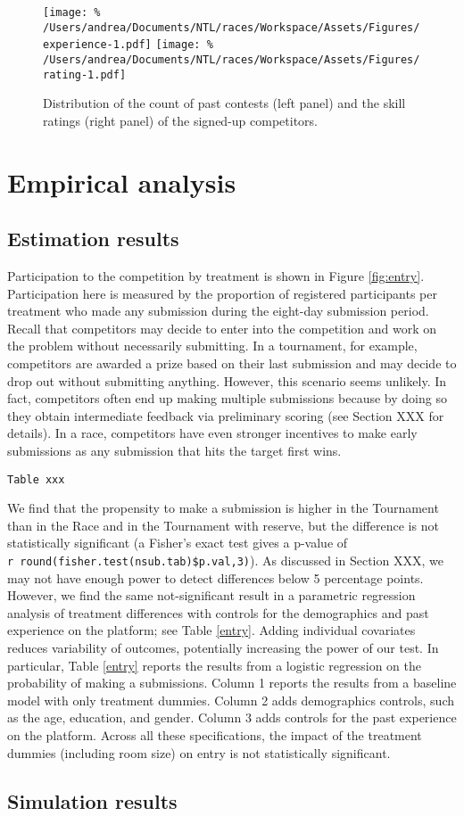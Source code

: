 \begin{figure}
\centering
\texttt{[image: \%
  /Users/andrea/Documents/NTL/races/Workspace/Assets/Figures/experience-1.pdf]}
\texttt{[image: \%
  /Users/andrea/Documents/NTL/races/Workspace/Assets/Figures/rating-1.pdf]}
\caption{Distribution of the count of past contests (left panel) and the skill ratings (right panel) of the signed-up competitors.}
\label{eq: distribution experience}
\end{figure}

\section{Empirical analysis}\label{empirical-analysis}

\subsection{Estimation results}\label{estimation-results}

Participation to the competition by treatment is shown in Figure
\ref{fig:entry}. Participation here is measured by the proportion of
registered participants per treatment who made any submission during the
eight-day submission period. Recall that competitors may decide to enter
into the competition and work on the problem without necessarily
submitting. In a tournament, for example, competitors are awarded a
prize based on their last submission and may decide to drop out without
submitting anything. However, this scenario seems unlikely. In fact,
competitors often end up making multiple submissions because by doing so
they obtain intermediate feedback via preliminary scoring (see Section
XXX for details). In a race, competitors have even stronger incentives
to make early submissions as any submission that hits the target first
wins.

\begin{verbatim}
Table xxx
\end{verbatim}

We find that the propensity to make a submission is higher in the
Tournament than in the Race and in the Tournament with reserve, but the
difference is not statistically significant (a Fisher's exact test gives
a p-value of \texttt{r\ round(fisher.test(nsub.tab)\$p.val,3)}). As
discussed in Section XXX, we may not have enough power to detect
differences below 5 percentage points. However, we find the same
not-significant result in a parametric regression analysis of treatment
differences with controls for the demographics and past experience on
the platform; see Table \ref{entry}. Adding individual covariates
reduces variability of outcomes, potentially increasing the power of our
test. In particular, Table \ref{entry} reports the results from a
logistic regression on the probability of making a submissions. Column 1
reports the results from a baseline model with only treatment dummies.
Column 2 adds demographics controls, such as the age, education, and
gender. Column 3 adds controls for the past experience on the platform.
Across all these specifications, the impact of the treatment dummies
(including room size) on entry is not statistically significant.

\subsection{Simulation results}\label{simulation-results}
